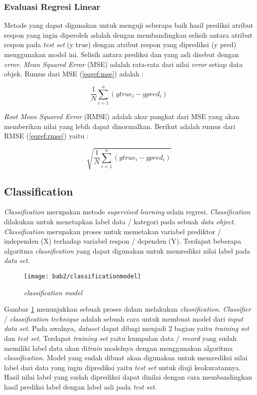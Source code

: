 \subsubsection{Evaluasi Regresi Linear}
Metode yang dapat digunakan untuk menguji seberapa baik hasil prediksi atribut respon yang ingin diperoleh adalah dengan membandingkan selisih antara atribut respon pada \textit{test set} (y true) dengan atribut respon yang diprediksi (y pred) menggunakan model ini. Selisih antara prediksi dan yang asli disebut dengan \textit{error}. \textit{Mean Squared Error} (MSE) adalah rata-rata dari nilai \textit{error} setiap data objek. Rumus dari MSE (\ref{eqref:mse}) adalah : 


\begin{equation}
  \frac{1}{N}\sum_{i=1}^{n} (y true_i - y pred_i)
  \label{eqref:mse}
\end{equation}

\textit{Root Mean Squared Error} (RMSE) adalah akar pangkat dari MSE yang akan memberikan nilai yang lebih dapat dinormalkan. Berikut adalah rumus dari RMSE (\ref{eqref:rmse}) yaitu : 

\begin{equation}
 \sqrt{\frac{1}{N}\sum_{i=1}^{n} (y true_i - y pred_i)}
  \label{eqref:rmse}
\end{equation}

		
	
\subsection{Classification}
\textit{Classification} merupakan metode \textit{supervised learning} selain regresi. \textit{Classification} dilakukan untuk menetapkan label data / kategori pada sebuah \textit{data object}. \textit{Classification} merupakan proses untuk memetakan variabel prediktor / independen (X) terhadap variabel respon / dependen (Y). Terdapat beberapa algoritma \textit{classification} yang dapat digunakan untuk memrediksi nilai label pada \textit{data set}. 
\pagebreak
\begin{figure}[h!]
	\centering  
	\texttt{[image: bab2/classificationmodel]}   
	\label{fig:classificationprocess} 
	\caption{\textit{classification model}}
\end{figure} 

Gambar \ref{fig:classificationprocess} menunjukkan sebuah proses dalam melakukan \textit{classification}. \textit{Classifier} / \textit{classification technique} adalah sebuah cara untuk membuat model dari \textit{input data set}. Pada awalnya, \textit{dataset} dapat dibagi menjadi 2 bagian yaitu \textit{training set} dan \textit{test set}. Terdapat \textit{training set} yaitu kumpulan data / \textit{record} yang sudah memiliki label data akan di\textit{train} modelnya dengan menggunakan algoritma \textit{classification}. Model yang sudah dibuat akan digunakan untuk memrediksi nilai label dari data yang ingin diprediksi yaitu \textit{test set} untuk diuji keakuratannya. Hasil nilai label yang sudah diprediksi dapat dinilai dengan cara membandingkan hasil prediksi label dengan label asli pada \textit{test set}.



